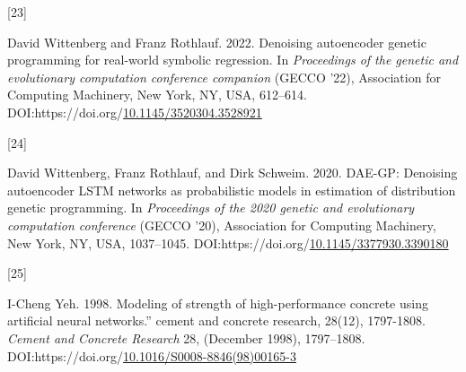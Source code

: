 \documentclass[
  11pt,
]{article}
\newlength{\cslhangindent}
\newlength{\csllabelwidth}
\newlength{\cslentryspacingunit} %
\newenvironment{CSLReferences}[2] %
 {%
  \setlength{\parindent}{0pt}
  \ifodd #1
  \let\oldpar\par
  \def\par{\hangindent=\cslhangindent\oldpar}
  \fi
  \setlength{\parskip}{#2\cslentryspacingunit}
 }%
 {}
\newcommand{\CSLLeftMargin}[1]{\parbox[t]{\csllabelwidth}{#1}}
\newcommand{\CSLRightInline}[1]{\parbox[t]{\linewidth - \csllabelwidth}{#1}\break}
\begin{document}
\begin{CSLReferences}{0}{0}
\leavevmode{}%
\CSLLeftMargin{{[}23{]} }%
\CSLRightInline{David Wittenberg and Franz Rothlauf. 2022. Denoising autoencoder genetic programming for real-world symbolic regression. In \emph{Proceedings of the genetic and evolutionary computation conference companion} (GECCO '22), Association for Computing Machinery, New York, NY, USA, 612--614. DOI:https://doi.org/\href{https://doi.org/10.1145/3520304.3528921}{10.1145/3520304.3528921}}

\leavevmode{}%
\CSLLeftMargin{{[}24{]} }%
\CSLRightInline{David Wittenberg, Franz Rothlauf, and Dirk Schweim. 2020. DAE-GP: Denoising autoencoder LSTM networks as probabilistic models in estimation of distribution genetic programming. In \emph{Proceedings of the 2020 genetic and evolutionary computation conference} (GECCO '20), Association for Computing Machinery, New York, NY, USA, 1037--1045. DOI:https://doi.org/\href{https://doi.org/10.1145/3377930.3390180}{10.1145/3377930.3390180}}

\leavevmode{}%
\CSLLeftMargin{{[}25{]} }%
\CSLRightInline{I-Cheng Yeh. 1998. Modeling of strength of high-performance concrete using artificial neural networks.'' cement and concrete research, 28(12), 1797-1808. \emph{Cement and Concrete Research} 28, (December 1998), 1797--1808. DOI:https://doi.org/\href{https://doi.org/10.1016/S0008-8846(98)00165-3}{10.1016/S0008-8846(98)00165-3}}

\end{CSLReferences}
\end{document}
